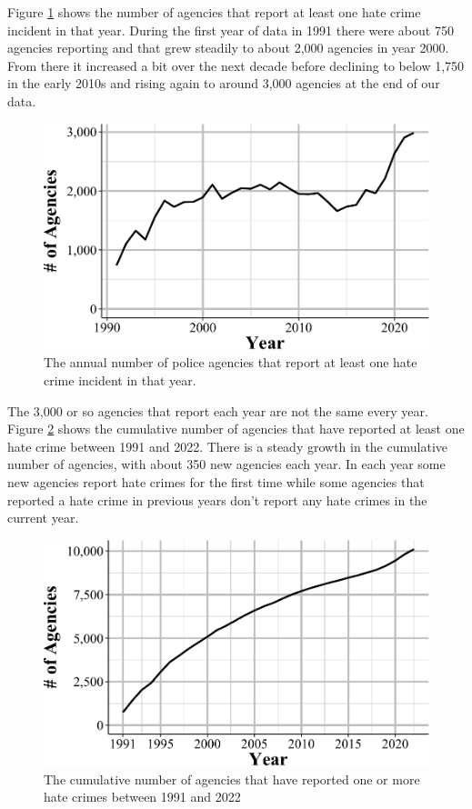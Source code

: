 \documentclass[
  12pt,
  openany]{book}
\begin{document}
Figure \ref{fig:hateAgencies} shows the number of agencies that report at least one hate crime incident in that year. During the first year of data in 1991 there were about 750 agencies reporting and that grew steadily to about 2,000 agencies in year 2000. From there it increased a bit over the next decade before declining to below 1,750 in the early 2010s and rising again to around 3,000 agencies at the end of our data.

\begin{figure}

{\centering \includegraphics[width=0.9\linewidth]{09_hate_crime_files/figure-latex/hateAgencies-1} 

}

\caption{The annual number of police agencies that report at least one hate crime incident in that year.}\label{fig:hateAgencies}
\end{figure}

The 3,000 or so agencies that report each year are not the same every year. Figure \ref{fig:hateCrimesEver} shows the cumulative number of agencies that have reported at least one hate crime between 1991 and 2022. There is a steady growth in the cumulative number of agencies, with about 350 new agencies each year. In each year some new agencies report hate crimes for the first time while some agencies that reported a hate crime in previous years don't report any hate crimes in the current year.

\begin{figure}

{\centering \includegraphics[width=0.9\linewidth]{09_hate_crime_files/figure-latex/hateCrimesEver-1} 

}

\caption{The cumulative number of agencies that have reported one or more hate crimes between 1991 and 2022}\label{fig:hateCrimesEver}
\end{figure}
\end{document}
